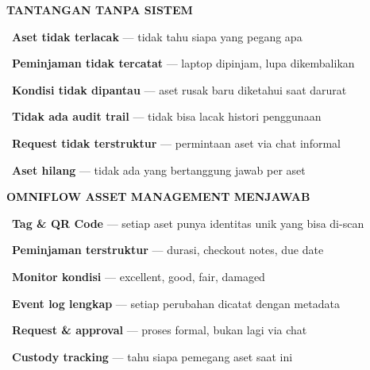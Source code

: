 \documentclass[a4paper]{article}
\begin{document}
\noindent
\begin{minipage}[t]{0.485\textwidth}
    \colorbox{RedLight}{%
        \begin{minipage}{\dimexpr\textwidth-2\fboxsep\relax}
            {\fontsize{10}{13}\selectfont\bfseries\color{RedText} TANTANGAN TANPA SISTEM}
        \end{minipage}}\par
    \vspace{4pt}

    {\fontsize{9.5}{13}\selectfont\color{TextDark}%
    \textbullet\ \textbf{Aset tidak terlacak} --- tidak tahu siapa yang pegang apa\par\vspace{4pt}%
    \textbullet\ \textbf{Peminjaman tidak tercatat} --- laptop dipinjam, lupa dikembalikan\par\vspace{4pt}%
    \textbullet\ \textbf{Kondisi tidak dipantau} --- aset rusak baru diketahui saat darurat\par\vspace{4pt}%
    \textbullet\ \textbf{Tidak ada audit trail} --- tidak bisa lacak histori penggunaan\par\vspace{4pt}%
    \textbullet\ \textbf{Request tidak terstruktur} --- permintaan aset via chat informal\par\vspace{4pt}%
    \textbullet\ \textbf{Aset hilang} --- tidak ada yang bertanggung jawab per aset}%
\end{minipage}%
\hfill%
\begin{minipage}[t]{0.485\textwidth}
    \colorbox{BluePrimary}{%
        \begin{minipage}{\dimexpr\textwidth-2\fboxsep\relax}
            {\fontsize{10}{13}\selectfont\bfseries\color{White} OMNIFLOW ASSET MANAGEMENT MENJAWAB}
        \end{minipage}}\par
    \vspace{4pt}

    {\fontsize{9.5}{13}\selectfont\color{TextDark}%
    \textbullet\ \textbf{Tag \& QR Code} --- setiap aset punya identitas unik yang bisa di-scan\par\vspace{4pt}%
    \textbullet\ \textbf{Peminjaman terstruktur} --- durasi, checkout notes, due date\par\vspace{4pt}%
    \textbullet\ \textbf{Monitor kondisi} --- excellent, good, fair, damaged\par\vspace{4pt}%
    \textbullet\ \textbf{Event log lengkap} --- setiap perubahan dicatat dengan metadata\par\vspace{4pt}%
    \textbullet\ \textbf{Request \& approval} --- proses formal, bukan lagi via chat\par\vspace{4pt}%
    \textbullet\ \textbf{Custody tracking} --- tahu siapa pemegang aset saat ini}%
\end{minipage}
\end{document}
